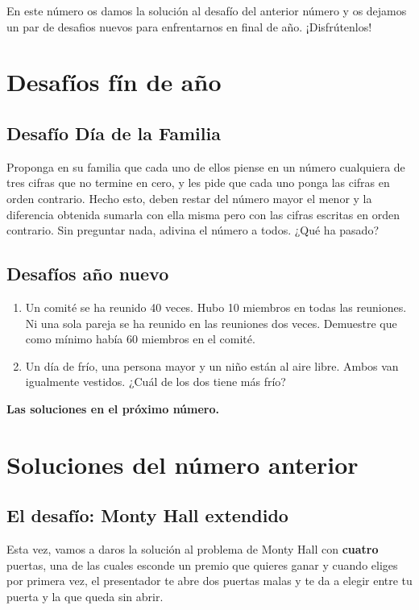 \begin{multicols}{2}

  \cappar En este número os damos la solución al desafío del anterior
  número y os dejamos un par de desafios nuevos para enfrentarnos en
  final de año. ¡Disfrútenlos!


\section*{Desafíos fín de año}
\subsection{Desafío Día de la Familia}
Proponga en su familia que cada uno de ellos piense en un número cualquiera de tres cifras
que no termine en cero, y les pide que cada uno ponga las cifras en orden
contrario. Hecho esto, deben restar del número mayor el menor y la
diferencia obtenida sumarla con ella misma pero con las cifras
escritas en orden contrario. Sin preguntar nada, adivina el número
a todos. ¿Qué ha pasado?
\subsection{Desafíos año nuevo}
\begin{enumerate}
\item Un comité se ha reunido 40 veces. Hubo 10 miembros en
  todas las reuniones. Ni una sola pareja se ha reunido en las
  reuniones dos veces.  Demuestre que como mínimo había 60 miembros en
  el comité.
\item Un día de frío, una persona mayor y un niño están al aire libre. Ambos van igualmente vestidos. ¿Cuál de los dos tiene más frío?
\end{enumerate}
{\bf Las soluciones en el próximo número.}
\section*{\textcolor{redsol}{Soluciones del número anterior}}
\subsection{El desafío: Monty Hall extendido}
Esta vez, vamos a daros la solución al problema de Monty Hall con
\textbf{cuatro} puertas, una de las cuales esconde un premio que
quieres ganar y cuando eliges por primera vez, el presentador te abre
dos puertas malas y te da a elegir entre tu puerta y la que queda sin
abrir.


\end{multicols}
